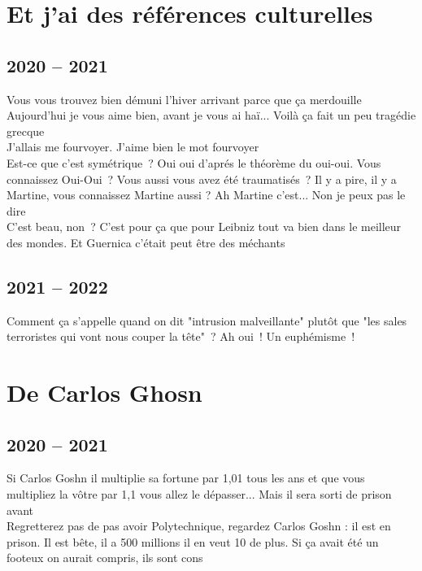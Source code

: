 \documentclass[french, a4paper, openany]{book}
\begin{document}
\chapter{Et j'ai des références culturelles}

\section{2020 -- 2021}

	\noindent \og Vous vous trouvez bien démuni l'hiver arrivant parce que ça merdouille \fg \\
	\og Aujourd'hui je vous aime bien, avant je vous ai haï... Voilà ça fait un peu tragédie grecque \fg \\
	\og J'allais me fourvoyer. J'aime bien le mot fourvoyer \fg \\
	\og Est-ce que c'est symétrique~? Oui oui d'aprés le théorème du oui-oui. Vous connaissez Oui-Oui~? Vous aussi vous avez été traumatisés~? Il y a pire, il y a Martine, vous connaissez Martine aussi ? Ah Martine c'est... Non je peux pas le dire \fg \\
	\og C'est beau, non~? C'est pour ça que pour Leibniz tout va bien dans le meilleur des mondes. Et Guernica c'était peut être des méchants \fg \\	

\section{2021 -- 2022}

	\noindent \og Comment ça s'appelle quand on dit "intrusion malveillante" plutôt que "les sales terroristes qui vont nous couper la tête"~? Ah oui~! Un euphémisme~! \fg \\
 
\chapter{De Carlos Ghosn}

\section{2020 -- 2021}

	\noindent \og Si Carlos Goshn il multiplie sa fortune par 1,01 tous les ans et que vous multipliez la vôtre par 1,1 vous allez le dépasser... Mais il sera sorti de prison avant \fg \\
	\og Regretterez pas de pas avoir Polytechnique, regardez Carlos Goshn : il est en prison. Il est bête, il a 500 millions il en veut 10 de plus. Si ça avait été un footeux on aurait compris, ils sont cons \fg \\
\end{document}

